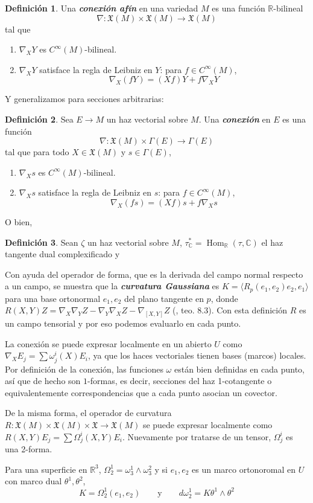 \documentclass[spanish]{article}
\theoremstyle{definition}
\newtheorem*{defn}{Definición}
\newcommand{\R}{\mathbb{R}}
\newcommand{\C}{\mathbb{C}}
\newcommand{\X}{\mathfrak{X}}
\newcommand{\Cinf}{C^\infty}
\DeclareMathOperator{\Hom}{Hom}
\begin{document}
	\begin{defn}
		Una \textbf{\textit{conexión afín}} en una variedad $M$ es una función $\R$-bilineal
		\[\nabla:\X(M)\times\X(M)\to\X(M)\]
		tal que
		\begin{enumerate}
			\item $\nabla_XY$ es $\Cinf(M)$-bilineal.
			\item $\nabla_XY$ satisface la regla de Leibniz en $Y$: para $f\in\Cinf(M)$,
			\[\nabla_X(fY)=(Xf)Y+f\nabla_XY\]
		\end{enumerate}
	\end{defn}
	Y generalizamos para secciones arbitrarias:
	\begin{defn}
		Sea $E\to M$ un haz vectorial sobre $M$. Una \textbf{\textit{conexión}} en $E$ es una función
		\[\nabla:\X(M)\times\Gamma(E)\to \Gamma(E)\]
		tal que para todo $X\in\X(M)$ y $s\in\Gamma(E)$,
		\begin{enumerate}
			\item $\nabla_Xs$ es $\Cinf(M)$-bilineal.
			\item $\nabla_Xs$ satisface la regla de Leibniz en $s$: para $f\in\Cinf(M)$,
			\[\nabla_X(fs)=(Xf)s+f\nabla_Xs\]
		\end{enumerate}
	\end{defn}
	O bien,
	\begin{defn}
		Sean $\zeta$ un haz vectorial sobre $M$, $\tau^*_\C=\Hom_\R(\tau,\C)$ el haz tangente dual complexificado y 
	\end{defn}
	
	Con ayuda del operador de forma, que es la derivada del campo normal respecto a un campo, se muestra que la \textbf{\textit{curvatura Gaussiana}} es $K=\langle R_p(e_1,e_2)e_2,e_1\rangle$ para una base ortonormal $e_1,e_2$ del plano tangente en $p$, donde $R(X,Y)Z=\nabla_X\nabla_YZ-\nabla_Y\nabla_XZ-\nabla_{[X,Y]}Z$ (\cite{Loring-dif}, teo. 8.3). Con esta definición $R$ es un campo tensorial y por eso podemos evaluarlo en cada punto.
	
	La conexión se puede expresar localmente en un abierto $U$ como $\nabla_XE_j=\sum\omega_j^i(X)E_i$, ya que los haces vectoriales tienen bases (marcos) locales. Por definición de la conexión, las funciones $\omega$ están bien definidas en cada punto, así que de hecho son $1$-formas, es decir, secciones del haz 1-cotangente o equivalentemente correspondencias que a cada punto asocian un covector.
	
	De la misma forma, el operador de curvatura $R:\X(M)\times\X(M)\times\X\to\X(M)$ se puede expresar localmente como $R(X,Y)E_j=\sum\Omega_j^i(X,Y)E_i$. Nuevamente por tratarse de un tensor, $\Omega_j^i$ es una 2-forma.
	
	Para una superficie en $\R^3$, $\Omega_2^1=\omega_3^1\wedge\omega_3^2$ y si $e_1,e_2$ es un marco ortonoromal en $U$ con marco dual $\theta^1,\theta^2$,
	\[K=\Omega_2^1(e_1,e_2)\qquad\text{y}\qquad d\omega_2^1=K\theta^1\wedge\theta^2\]
	\fi
\end{document}
